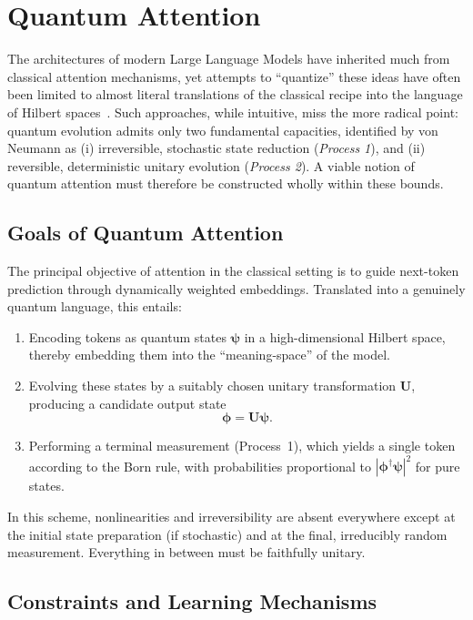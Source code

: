 \documentclass[%
  reprint,
  superscriptaddress,
  showpacs,
  showkeys,
  amsmath,amssymb,
  pra,
  longbibliography,
  floatfix,
  x11names
]{revtex4-2}
\begin{document}
\section{Quantum Attention}

The architectures of modern Large Language Models have inherited much from
classical attention mechanisms, yet attempts to ``quantize'' these ideas
have often been limited to almost literal translations of the classical recipe
into the language of Hilbert spaces~\cite{zhang2025surveyquantumtransformersarchitectures}. Such approaches, while intuitive,
miss the more radical point: quantum evolution admits only two fundamental
capacities, identified by von Neumann as
(i) irreversible, stochastic state reduction (\emph{Process 1}),
and (ii) reversible, deterministic unitary evolution (\emph{Process 2}).
A viable notion of quantum attention must therefore be constructed wholly within
these bounds.

\subsection{Goals of Quantum Attention}

The principal objective of attention in the classical setting is to guide
next-token prediction through dynamically weighted embeddings.
Translated into a genuinely quantum language, this entails:
\begin{enumerate}
    \item Encoding tokens as quantum states $\bm{\psi}$
    in a high-dimensional Hilbert space,
    thereby embedding them into the ``meaning-space'' of the model.
    \item Evolving these states by a suitably chosen unitary transformation $\bm{U}$,
    producing a candidate output state
    \begin{equation}
    \bm{\phi} = \bm{U} \bm{\psi}.
    \end{equation}
    \item Performing a terminal measurement (Process~1),
    which yields a single token according to the Born rule,
    with probabilities proportional to $|\bm{\phi}^\dagger \bm{\psi}|^{2}$
    for pure states.
\end{enumerate}
In this scheme, nonlinearities and irreversibility are absent everywhere
except at the initial state preparation (if stochastic) and at the final,
irreducibly random measurement. Everything in between must be faithfully
unitary.

\subsection{Constraints and Learning Mechanisms}
\end{document}

